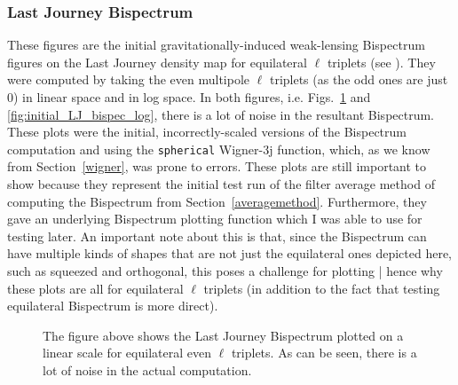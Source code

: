 \documentclass[11pt]{article}
\renewcommand{\_}[1]{\underline{ #1 }}
\begin{document}
{\subsubsection{Last Journey Bispectrum}

These figures are the initial gravitationally-induced weak-lensing Bispectrum figures on the Last Journey density map for equilateral $\ell$ triplets (see \cite{Heitmann_2021}). They were computed by taking the even multipole $\ell$ triplets (as the odd ones are just 0) in linear space and in log space. In both figures, i.e. Figs.~\ref{fig:initial_LJ_bispec_linear} and \ref{fig:initial_LJ_bispec_log}, there is a lot of noise in the resultant Bispectrum. These plots were the initial, incorrectly-scaled versions of the Bispectrum computation and using the \texttt{spherical} Wigner-3j function, which, as we know from Section~\ref{wigner}, was prone to errors. These plots are still important to show because they represent the initial test run of the filter average method of computing the Bispectrum from Section~\ref{averagemethod}. Furthermore, they gave an underlying Bispectrum plotting function which I was able to use for testing later. An important note about this is that, since the Bispectrum can have multiple kinds of shapes that are not just the equilateral ones depicted here, such as squeezed and orthogonal, this poses a challenge for plotting | hence why these plots are all for equilateral $\ell$ triplets (in addition to the fact that testing equilateral Bispectrum is more direct).

\begin{figure}[H]
    \centering
    \caption{The figure above shows the Last Journey Bispectrum plotted on a linear scale for equilateral even $\ell$ triplets. As can be seen, there is a lot of noise in the actual computation.}\label{fig:initial_LJ_bispec_linear}
\end{figure}

}
\end{document}
